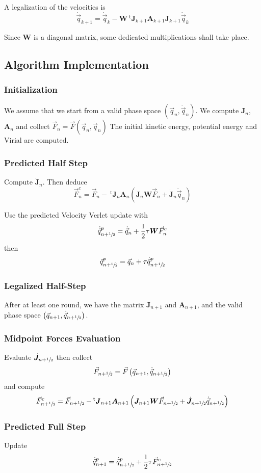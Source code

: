 \documentclass[aps,twocolumn]{revtex4}
\newcommand{\mymat}[1]{\boldsymbol{#1}}
\newcommand{\mytrn}[1]{{\!\!~^{\mathsf{t}}{#1}}}
\newcommand{\half}{\sfrac{1}{2}}
\newcommand{\q}{\vec{q}}
\newcommand{\dq}{\dot{\q}}
\newcommand{\J}{\mymat{J}}
\newcommand{\dJ}{\dot{\J}}
\newcommand{\tJ}{\mytrn{\J}}
\newcommand{\W}{\mymat{W}}
\newcommand{\A}{\mymat{A}}
\begin{document}
A legalization of the velocities is
$$
	\dq_{k+1} = \dq_{k} - \W \tJ_{k+1}  \A_{k+1} \J_{k+1} \dq_{k}
$$

Since $\W$ is a diagonal matrix, some dedicated multiplications shall take place.

\subsection{Algorithm Implementation}

\subsubsection{Initialization}
We assume that we start from a valid phase space $\left(\q_n,\dq_n\right)$.
We compute $\J_n$, $\A_n$ and collect $\vec{F}_n = \vec{F}\left(\q_n,\dq_n\right)$
The initial kinetic energy, potential energy and Virial are computed.

\subsubsection{Predicted Half Step}
\label{pred0}
Compute $\dJ_n$.
Then deduce $$\vec{F}^c_n=\vec{F}_n - \tJ_n\A_n\left(\J_n\W\vec{F}_n + \dJ_n\dq_n\right)$$

Use the predicted Velocity Verlet update with
$$
	\dq^p_{n+\half} = \dq_{n} + \frac{1}{2} \tau \W \vec{F}^c_{n}
$$
then
$$
	\q^p_{n+\half} = \q_{n} + \tau \dq^p_{n+\half}
$$

\subsubsection{Legalized Half-Step}
After at least one round, we have the matrix $\J_{n+1}$ and $\A_{n+1}$, and the
valid phase space $\left(\q_{n+1},\dq_{n+\half}\right)$.

\subsubsection{Midpoint Forces Evaluation}
Evaluate $\dJ_{n+\half}$ then collect
$$
	\vec{F}_{n+\half} = \vec{F}\left(\q_{n+1},\dq_{n+\half}\right)
$$
and compute
$$
	\vec{F}^c_{n+\half}=\vec{F}_{n+\half} - \tJ_{n+1}\A_{n+1}\left(\J_{n+1}\W\vec{F}_{n+\half} + \dJ_{n+\half}\dq_{n+\half}\right)
$$

\subsubsection{Predicted Full Step}
Update
$$
	\dq^p_{n+1} = \dq^p_{n+\half} + \frac{1}{2} \tau \vec{F}^c_{n+\half}
$$
\end{document}
